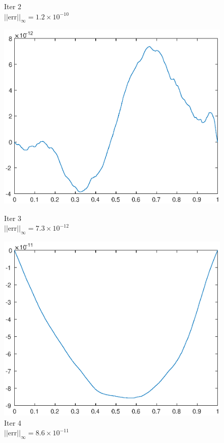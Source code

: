 \documentclass[lang=cn,10pt]{elegantbook}
\begin{document}
\begin{figure}[H]
\begin{minipage}[t]{0.24\linewidth}
    \caption*{\small Iter 2 \\ $||\text{err}||_\infty=1.2\times 10^{-10}$}
  \end{minipage}
  \begin{minipage}[t]{0.24\linewidth}
    \centering
    \includegraphics[width=0.9\linewidth]{figure/1-5-9.eps}
    \caption*{\small Iter 3 \\ $||\text{err}||_\infty=7.3\times 10^{-12}$}
  \end{minipage}
  \begin{minipage}[t]{0.24\linewidth}
    \centering
    \includegraphics[width=0.9\linewidth]{figure/1-5-10.eps}
    \caption*{\small Iter 4 \\ $||\text{err}||_\infty=8.6\times 10^{-11}$}
  \end{minipage}
\end{figure}
\end{document}

